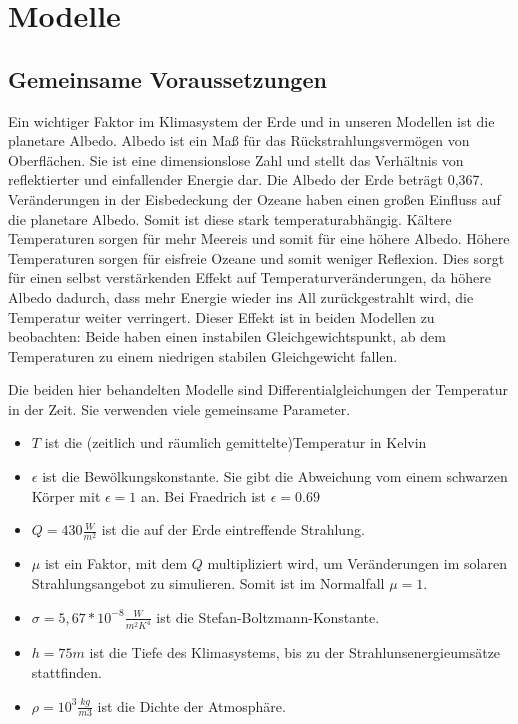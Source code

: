 \documentclass[]{report}
\begin{document}
	
	
	
	
	
	
	
\chapter{Modelle}

\section{Gemeinsame Voraussetzungen}

Ein wichtiger Faktor im Klimasystem der Erde und in unseren Modellen ist die planetare Albedo. Albedo ist ein Maß für das Rückstrahlungsvermögen von Oberflächen. Sie ist eine dimensionslose Zahl und stellt das Verhältnis von reflektierter und einfallender Energie dar. Die Albedo der Erde beträgt 0,367. Veränderungen in der Eisbedeckung der Ozeane haben einen großen Einfluss auf die planetare Albedo. Somit ist diese stark temperaturabhängig. Kältere Temperaturen sorgen für mehr Meereis und somit für eine höhere Albedo. Höhere Temperaturen sorgen für eisfreie Ozeane und somit weniger Reflexion. Dies sorgt für einen selbst verstärkenden Effekt auf Temperaturveränderungen, da höhere Albedo dadurch, dass mehr Energie wieder ins All zurückgestrahlt wird, die Temperatur weiter verringert. Dieser Effekt ist in beiden Modellen zu beobachten: Beide haben einen instabilen Gleichgewichtspunkt, ab dem Temperaturen zu einem niedrigen stabilen Gleichgewicht fallen.\par\bigskip

Die beiden hier behandelten Modelle sind Differentialgleichungen der Temperatur in der Zeit. Sie verwenden viele gemeinsame Parameter.\\

\begin{itemize}
	\item $T$ ist die (zeitlich und räumlich gemittelte)Temperatur in Kelvin
	\item $\epsilon$ ist die Bewölkungskonstante. Sie gibt die Abweichung vom einem schwarzen Körper mit $\epsilon=1$ an. Bei Fraedrich ist $\epsilon = 0.69$
	\item $Q = 430 \frac{W}{m^2}$ ist die auf der Erde eintreffende Strahlung.
	\item $\mu$ ist ein Faktor, mit dem $Q$ multipliziert wird, um Veränderungen im solaren Strahlungsangebot zu simulieren. Somit ist im Normalfall $\mu = 1$.
	\item $\sigma = 5,67*10^{-8} \frac{W}{m^2K^4}$ ist die Stefan-Boltzmann-Konstante.
	\item $h = 75m$ ist die Tiefe des Klimasystems, bis zu der Strahlunsenergieumsätze stattfinden.
	\item $\rho = 10^3 \frac{kg}{m3}$ ist die Dichte der Atmosphäre.
 
\end{itemize}
\end{document}
